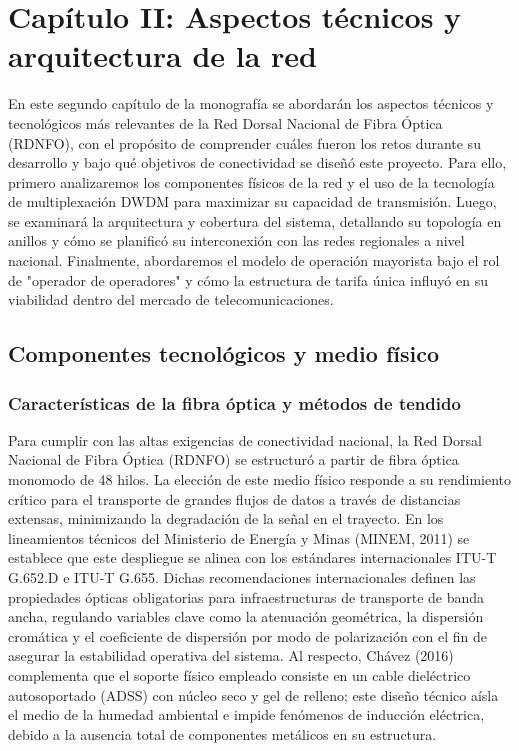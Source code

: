 \section{Capítulo II: Aspectos técnicos y arquitectura de la red}
En este segundo capítulo de la monografía se abordarán los aspectos técnicos y tecnológicos más relevantes de la Red Dorsal Nacional de Fibra Óptica (RDNFO), con el propósito de comprender cuáles fueron los retos durante su desarrollo y bajo qué objetivos de conectividad se diseñó este proyecto. Para ello, primero analizaremos los componentes físicos de la red y el uso de la tecnología de multiplexación DWDM para maximizar su capacidad de transmisión. Luego, se examinará la arquitectura y cobertura del sistema, detallando su topología en anillos y cómo se planificó su interconexión con las redes regionales a nivel nacional. Finalmente, abordaremos el modelo de operación mayorista bajo el rol de "operador de operadores" y cómo la estructura de tarifa única influyó en su viabilidad dentro del mercado de telecomunicaciones.
\subsection{Componentes tecnológicos y medio físico}
\subsubsection{Características de la fibra óptica y métodos de tendido}
Para cumplir con las altas exigencias de conectividad nacional, la Red Dorsal Nacional de Fibra Óptica (RDNFO) se estructuró a partir de fibra óptica monomodo de 48 hilos. La elección de este medio físico responde a su rendimiento crítico para el transporte de grandes flujos de datos a través de distancias extensas, minimizando la degradación de la señal en el trayecto. En los lineamientos técnicos del Ministerio de Energía y Minas (MINEM, 2011) se establece que este despliegue se alinea con los estándares internacionales ITU-T G.652.D e ITU-T G.655. Dichas recomendaciones internacionales definen las propiedades ópticas obligatorias para infraestructuras de transporte de banda ancha, regulando variables clave como la atenuación geométrica, la dispersión cromática y el coeficiente de dispersión por modo de polarización con el fin de asegurar la estabilidad operativa del sistema. Al respecto, Chávez (2016) complementa que el soporte físico empleado consiste en un cable dieléctrico autosoportado (ADSS) con núcleo seco y gel de relleno; este diseño técnico aísla el medio de la humedad ambiental e impide fenómenos de inducción eléctrica, debido a la ausencia total de componentes metálicos en su estructura.

